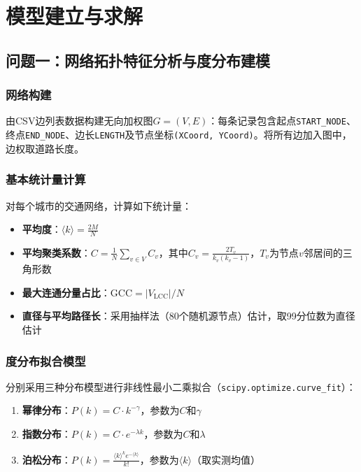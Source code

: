 \documentclass[12pt,a4paper]{article}
\begin{document}
\section{模型建立与求解}

\subsection{问题一：网络拓扑特征分析与度分布建模}

\subsubsection{网络构建}

由CSV边列表数据构建无向加权图$G=(V,E)$：每条记录包含起点\texttt{START\_NODE}、终点\texttt{END\_NODE}、边长\texttt{LENGTH}及节点坐标\texttt{(XCoord, YCoord)}。将所有边加入图中，边权取道路长度。

\subsubsection{基本统计量计算}

对每个城市的交通网络，计算如下统计量：

\begin{itemize}[leftmargin=2em]
    \item \textbf{平均度}：$\langle k \rangle = \frac{2M}{N}$
    \item \textbf{平均聚类系数}：$C = \frac{1}{N}\sum_{v \in V} C_v$，其中$C_v = \frac{2T_v}{k_v(k_v - 1)}$，$T_v$为节点$v$邻居间的三角形数
    \item \textbf{最大连通分量占比}：$\text{GCC} = |V_{\text{LCC}}| / N$
    \item \textbf{直径与平均路径长}：采用抽样法（80个随机源节点）估计，取99分位数为直径估计
\end{itemize}

\subsubsection{度分布拟合模型}

分别采用三种分布模型进行非线性最小二乘拟合（\texttt{scipy.optimize.curve\_fit}）：

\begin{enumerate}[label=(\arabic*)]
    \item \textbf{幂律分布}：$P(k) = C \cdot k^{-\gamma}$，参数为$C$和$\gamma$
    \item \textbf{指数分布}：$P(k) = C \cdot e^{-\lambda k}$，参数为$C$和$\lambda$
    \item \textbf{泊松分布}：$P(k) = \frac{\langle k \rangle^k e^{-\langle k \rangle}}{k!}$，参数为$\langle k \rangle$（取实测均值）
\end{enumerate}
\end{document}
